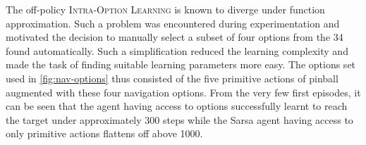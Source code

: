 The off-policy \textsc{Intra-Option Learning} is known to diverge under function approximation. Such a problem was encountered during experimentation and motivated the decision to manually select a subset of four options from the 34 found automatically. Such a simplification reduced the learning complexity and made the task of finding suitable learning parameters more easy. The options set used in \ref{fig:nav-options} thus consisted of the five primitive actions of pinball augmented with these four navigation options. From the very few first episodes, it can be seen that the agent having access to options successfully learnt to reach the target under approximately 300 steps while the Sarsa agent having access to only primitive actions flattens off above 1000. 

